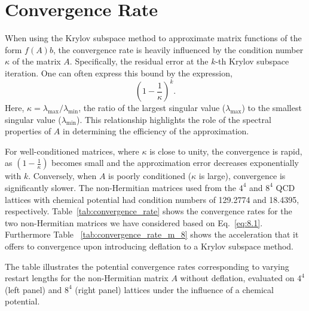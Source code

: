 \section{Convergence Rate}           
\label{sec:convergence_rate}

When using the Krylov subspace method to approximate matrix functions of the form $f(A)b$, the convergence rate is heavily influenced by the condition number $\kappa$ of the matrix $A$. Specifically, the residual error at the $k$-th Krylov subspace iteration. One can often express this bound by the expression,
\begin{equation}
    \left(1 - \frac{1}{\kappa}\right)^k.
    \label{eq:8.1}
\end{equation} 
Here, $\kappa = \lambda_{\max}/\lambda_{\min}$, the ratio of the largest singular value ($\lambda_{\max}$) to the smallest singular value ($\lambda_{\min}$). This relationship highlights the role of the spectral properties of $A$ in determining the efficiency of the approximation.

For well-conditioned matrices, where $\kappa$ is close to unity, the convergence is rapid, as $\left(1 - \frac{1}{\kappa}\right)$ becomes small and the approximation error decreases exponentially with $k$. Conversely, when $A$ is poorly conditioned ($\kappa$ is large), convergence is significantly slower. The non-Hermitian matrices used from the $4^4$ and $8^4$ QCD lattices with chemical potential had condition numbers of 129.2774 and 18.4395, respectively. Table~\ref{tab:convergence_rate} shows the convergence rates for the two non-Hermitian matrices we have considered based on Eq.~\eqref{eq:8.1}. Furthermore Table ~\ref{tab:convergence_rate_m_8} shows the acceleration that it offers to convergence upon introducing deflation to a Krylov subspace method.


\begin{table}[H]
    \centering
    \begin{minipage}{0.45\textwidth}
        \centering
    \end{minipage}
    \hspace{0.02\textwidth} %
    \begin{minipage}{0.45\textwidth}
        \centering
        
    \end{minipage}
    \caption{\small The table illustrates the potential convergence rates corresponding to varying restart lengths for the non-Hermitian matrix $A$ without deflation, evaluated on $4^4$ (left panel) and $8^4$ (right panel) lattices under the influence of a chemical potential.}
    \label{tab:convergence_rate} %
\end{table}


